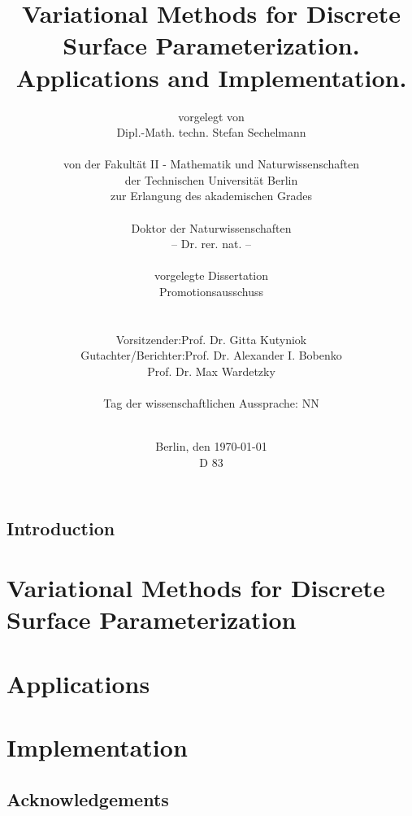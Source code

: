 \documentclass[a4paper]{book}
\title{Variational Methods for Discrete Surface Parameterization. Applications and Implementation.}
\author{
vorgelegt von\\
Dipl.-Math. techn. Stefan Sechelmann\\
\vspace{0.3cm}\\
von der Fakult{\"a}t II - Mathematik und Naturwissenschaften\\
der Technischen Universit{\"a}t Berlin\\
zur Erlangung des akademischen Grades\\
\vspace{0.3cm}\\
Doktor der Naturwissenschaften\\
-- Dr. rer. nat. --\\
\vspace{0.3cm}\\
vorgelegte Dissertation
\vspace{1.5cm}\\
Promotionsausschuss\\
\vspace{0.3cm}\\
\begin{tabular}{rl}
Vorsitzender: & Prof. Dr. Gitta Kutyniok \\
Gutachter/Berichter: & Prof. Dr. Alexander I. Bobenko \\
& Prof. Dr. Max Wardetzky 
\end{tabular}
\vspace{0.3cm}\\
Tag der wissenschaftlichen Aussprache: NN\\
\vspace{1cm}\\
}
\date{
	Berlin, den {\selectlanguage{german}\today}\\
	\vspace{0.3cm}
	D 83
}
\def\mainbibliography {
	\backmatter
	\setcounter{secnumdepth}{-1} 
	
	
}
\def\subfilebibliography {
	\backmatter
	\setcounter{secnumdepth}{-1} 
	
	
}
\def\subfilebibliographytwo {
	\backmatter
	\setcounter{secnumdepth}{-1} 
	
	
}
\begin{document}
\def\subfilebibliography{}
\def\subfilebibliographytwo{}

\frontmatter
\maketitle
\newpage

\tableofcontents
\newpage
\listoffigures

\newpage
\mainmatter
\setcounter{secnumdepth}{-1} 
\chapter{Introduction}
\setcounter{secnumdepth}{2} 
\part{Variational Methods for Discrete Surface Parameterization} 
%
%





\part{Applications}


%
\part{Implementation}





\newpage 
\mainbibliography

\chapter{Acknowledgements}
\end{document}
